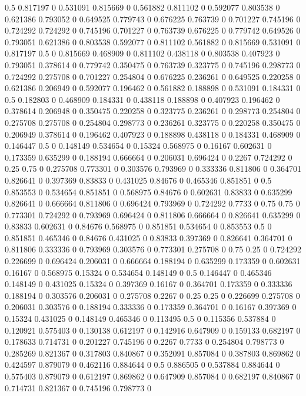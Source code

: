 0.5 0.817197 0
0.531091 0.815669 0
0.561882 0.811102 0
0.592077 0.803538 0
0.621386 0.793052 0
0.649525 0.779743 0
0.676225 0.763739 0
0.701227 0.745196 0
0.724292 0.724292 0
0.745196 0.701227 0
0.763739 0.676225 0
0.779742 0.649526 0
0.793051 0.621386 0
0.803538 0.592077 0
0.811102 0.561882 0
0.815669 0.531091 0
0.817197 0.5 0
0.815669 0.468909 0
0.811102 0.438118 0
0.803538 0.407923 0
0.793051 0.378614 0
0.779742 0.350475 0
0.763739 0.323775 0
0.745196 0.298773 0
0.724292 0.275708 0
0.701227 0.254804 0
0.676225 0.236261 0
0.649525 0.220258 0
0.621386 0.206949 0
0.592077 0.196462 0
0.561882 0.188898 0
0.531091 0.184331 0
0.5 0.182803 0
0.468909 0.184331 0
0.438118 0.188898 0
0.407923 0.196462 0
0.378614 0.206948 0
0.350475 0.220258 0
0.323775 0.236261 0
0.298773 0.254804 0
0.275708 0.275708 0
0.254804 0.298773 0
0.236261 0.323775 0
0.220258 0.350475 0
0.206949 0.378614 0
0.196462 0.407923 0
0.188898 0.438118 0
0.184331 0.468909 0
0.146447 0.5 0
0.148149 0.534654 0
0.15324 0.568975 0
0.16167 0.602631 0
0.173359 0.635299 0
0.188194 0.666664 0
0.206031 0.696424 0
0.2267 0.724292 0
0.25 0.75 0
0.275708 0.773301 0
0.303576 0.793969 0
0.333336 0.811806 0
0.364701 0.826641 0
0.397369 0.83833 0
0.431025 0.84676 0
0.465346 0.851851 0
0.5 0.853553 0
0.534654 0.851851 0
0.568975 0.84676 0
0.602631 0.83833 0
0.635299 0.826641 0
0.666664 0.811806 0
0.696424 0.793969 0
0.724292 0.7733 0
0.75 0.75 0
0.773301 0.724292 0
0.793969 0.696424 0
0.811806 0.666664 0
0.826641 0.635299 0
0.83833 0.602631 0
0.84676 0.568975 0
0.851851 0.534654 0
0.853553 0.5 0
0.851851 0.465346 0
0.84676 0.431025 0
0.83833 0.397369 0
0.826641 0.364701 0
0.811806 0.333336 0
0.793969 0.303576 0
0.773301 0.275708 0
0.75 0.25 0
0.724292 0.226699 0
0.696424 0.206031 0
0.666664 0.188194 0
0.635299 0.173359 0
0.602631 0.16167 0
0.568975 0.15324 0
0.534654 0.148149 0
0.5 0.146447 0
0.465346 0.148149 0
0.431025 0.15324 0
0.397369 0.16167 0
0.364701 0.173359 0
0.333336 0.188194 0
0.303576 0.206031 0
0.275708 0.2267 0
0.25 0.25 0
0.226699 0.275708 0
0.206031 0.303576 0
0.188194 0.333336 0
0.173359 0.364701 0
0.16167 0.397369 0
0.15324 0.431025 0
0.148149 0.465346 0
0.113495 0.5 0
0.115356 0.537884 0
0.120921 0.575403 0
0.130138 0.612197 0
0.142916 0.647909 0
0.159133 0.682197 0
0.178633 0.714731 0
0.201227 0.745196 0
0.2267 0.7733 0
0.254804 0.798773 0
0.285269 0.821367 0
0.317803 0.840867 0
0.352091 0.857084 0
0.387803 0.869862 0
0.424597 0.879079 0
0.462116 0.884644 0
0.5 0.886505 0
0.537884 0.884644 0
0.575403 0.879079 0
0.612197 0.869862 0
0.647909 0.857084 0
0.682197 0.840867 0
0.714731 0.821367 0
0.745196 0.798773 0
